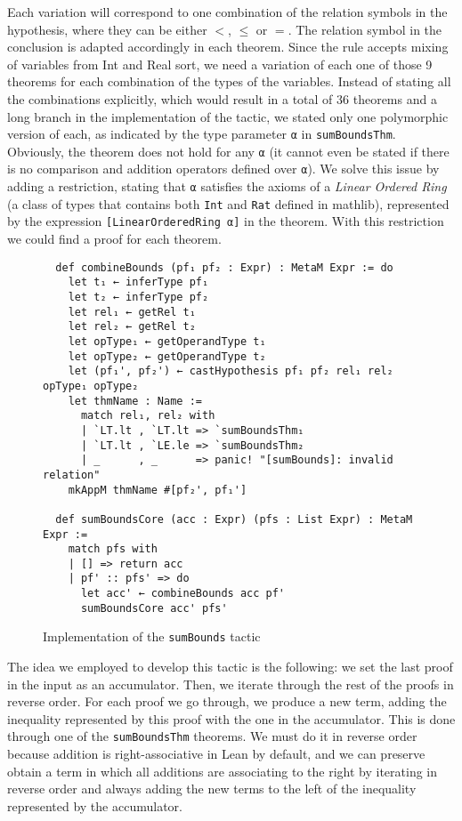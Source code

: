 Each variation will correspond to one combination of the relation symbols in the hypothesis, where
they can be either $<$, $\le$ or $=$. The relation symbol in the
conclusion is adapted accordingly in each theorem. Since the rule accepts mixing of variables
from Int and Real sort, we need a variation of each one of those 9 theorems for each combination
of the types of the variables. Instead of stating all the combinations explicitly, which would
result in a total of 36 theorems and a long branch in the implementation of the tactic,
we stated only one polymorphic version of each, as indicated by the type parameter \texttt{α} in \texttt{sumBoundsThm}.
Obviously, the theorem does not hold
for any \texttt{α} (it cannot even be stated if there is no comparison and addition operators defined over \texttt{α}).
We solve this issue by adding a restriction, stating that \texttt{α} satisfies the axioms of a
\textit{Linear Ordered Ring} (a class of types that contains both \texttt{Int} and \texttt{Rat} defined in mathlib), represented by the expression \texttt{[LinearOrderedRing α]} in the theorem. With this restriction we
could find a proof for each theorem.

\begin{figure}[t]
\begin{verbatim}
  def combineBounds (pf₁ pf₂ : Expr) : MetaM Expr := do
    let t₁ ← inferType pf₁
    let t₂ ← inferType pf₂
    let rel₁ ← getRel t₁
    let rel₂ ← getRel t₂
    let opType₁ ← getOperandType t₁
    let opType₂ ← getOperandType t₂
    let (pf₁', pf₂') ← castHypothesis pf₁ pf₂ rel₁ rel₂ opType₁ opType₂
    let thmName : Name :=
      match rel₁, rel₂ with
      | `LT.lt , `LT.lt => `sumBoundsThm₁
      | `LT.lt , `LE.le => `sumBoundsThm₂
      | _      , _      => panic! "[sumBounds]: invalid relation"
    mkAppM thmName #[pf₂', pf₁']

  def sumBoundsCore (acc : Expr) (pfs : List Expr) : MetaM Expr :=
    match pfs with
    | [] => return acc
    | pf' :: pfs' => do
      let acc' ← combineBounds acc pf'
      sumBoundsCore acc' pfs'
\end{verbatim}
\caption{Implementation of the \texttt{sumBounds} tactic}\label{sumBoundsTac}
\end{figure}

The idea we employed to develop this tactic is the following: we set the last
proof in the input as an accumulator. Then, we iterate through the rest of the proofs
in reverse order. For each proof we go through, we produce a new term, adding the
inequality represented by this proof with the one in the accumulator. This is done
through one of the \texttt{sumBoundsThm} theorems. We must do it in reverse order
because addition is right-associative in Lean by default, and we can preserve
obtain a term in which all additions are associating to the right by iterating
in reverse order and always adding the new terms to the left of the inequality
represented by the accumulator.


